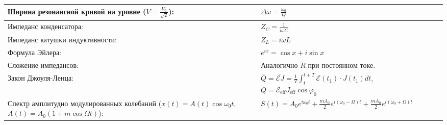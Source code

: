 \documentclass{article}
\begin{document}
\begin{tabular}{ |p{6cm}|p{3cm}|p{6cm}|p{3.5cm}|  }
\hline
Ширина резонансной кривой на уровне ($V = \frac{V_0}{\sqrt{2}}$):          &
$\Delta \omega=\frac{\omega_{0}}{Q}$                                       &
                                                                           &
                                                                           \\
\hline
Импеданс конденсатора:                                                     &
$Z_C = \frac{1}{i \omega C}$                                               &
                                                                           &
                                                                           \\
\hline
Импеданс катушки индуктивности:                                            &
$Z_L = i \omega L$                                                         &
                                                                           &
                                                                           \\
\hline
Формула Эйлера:                                                            &
$e^{i x}=\cos x+i \sin x$                                                  &
                                                                           &
                                                                           \\
\hline
Сложение импедансов:                                                       &
Аналогично $R$ при постоянном токе.                                        &
                                                                           &
                                                                           \\
\hline
Закон Джоуля-Ленца:                                                        &
$\bar{Q}=\overline{\mathcal{E} J}=\frac{1}{T} \int_{t}^{t+T} \mathcal{E}\left(t_{1}\right) \cdot J\left(t_{1}\right) d t$,
$\bar{Q}=\mathcal{E}_{\mathrm{eff}} J_{\mathrm{eff}} \cos \varphi_{0}$     &
                                                                           &
                                                                           \\
\hline
Спектр амплитудно модулированных колебаний ($x(t)=A(t) \cos \omega_{0} t$, $A(t)=A_{0}(1+m \cos \Omega t)$):&
$S(t)=A_{0} e^{i \omega_{0} t}+\frac{m A_{0}}{2} e^{i\left(\omega_{0}-\Omega\right) t}+\frac{m A_{0}}{2} e^{i\left(\omega_{0}+\Omega\right) t}$&
                                                                           &
                                                                           \\

\end{tabular}
\end{document}
